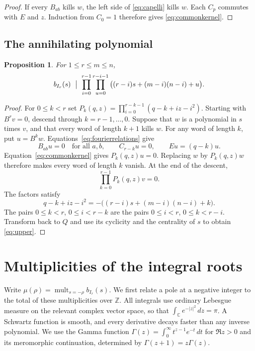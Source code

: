 \documentclass[11pt,a4paper]{article}
\numberwithin{equation}{section}
\newtheorem{proposition}[theorem]{Proposition}
\theoremstyle{definition}
\newcommand{\C}{\mathbb C}
\newcommand{\Z}{\mathbb Z}
\DeclareMathOperator{\mult}{mult}
\begin{document}
\begin{proof}
If every $B_{ab}$ kills $w$, the left side of \eqref{eq:capelli}
kills $w$. Each $C_p$ commutes with $E$ and $z$. Induction from
$C_0=1$ therefore gives \eqref{eq:commonkernel}.
\end{proof}

\subsection{The annihilating polynomial}\label{subsec:upperpolynomial}

\begin{proposition}\label{prop:upper}
For $1\le r\le m\le n$,
\begin{equation}\label{eq:upper}
b_{I_r}(s)\ \bigm|\
\prod_{i=0}^{r-1}\prod_{u=0}^{r-i-1}
       \big((r-i)s+(m-i)(n-i)+u\big).
\end{equation}
\end{proposition}
\begin{proof}
For $0\le k<r$ set
$P_k(q,z)=\prod_{i=0}^{r-k-1}(q-k+iz-i^2)$.
Starting with $B^rv=0$, descend through $k=r-1,\ldots,0$.
Suppose that $w$ is a polynomial in $s$ times $v$, and that every
word of length $k+1$ kills $w$. For any word of length $k$, put
$u=B^kw$. Equations~\eqref{eq:fourierrelations} give
\[
B_{ab}u=0\quad\text{for all }a,b,\qquad
C_{r-k}u=0,\qquad Eu=(q-k)u.
\]
Equation~\eqref{eq:commonkernel} gives $P_k(q,z)u=0$.
Replacing $w$ by $P_k(q,z)w$ therefore makes every word of length $k$
vanish. At the end of the descent,
\[
\prod_{k=0}^{r-1}P_k(q,z)v=0.
\]
The factors satisfy
\[
q-k+iz-i^2=-\big((r-i)s+(m-i)(n-i)+k\big).
\]
The pairs $0\le k<r$, $0\le i<r-k$ are the pairs
$0\le i<r$, $0\le k<r-i$. Transform back to $Q$ and use its cyclicity
and the centrality of $s$ to obtain \eqref{eq:upper}.
\end{proof}

\section{Multiplicities of the integral roots}\label{sec:integer}

Write $\mu(\rho)=\mult_{s=-\rho}b_{I_r}(s)$. We first relate a pole
at a negative integer to the total of these multiplicities over $\Z$.
All integrals use ordinary Lebesgue measure on the relevant complex
vector space, so that $\int_{\C}e^{-|z|^2}\,dz=\pi$.
A Schwartz function is smooth, and every derivative decays faster
than any inverse polynomial. We use the Gamma function
$\Gamma(z)=\int_0^\infty t^{z-1}e^{-t}\,dt$ for $\Re z>0$ and its
meromorphic continuation, determined by $\Gamma(z+1)=z\Gamma(z)$.
\end{document}
